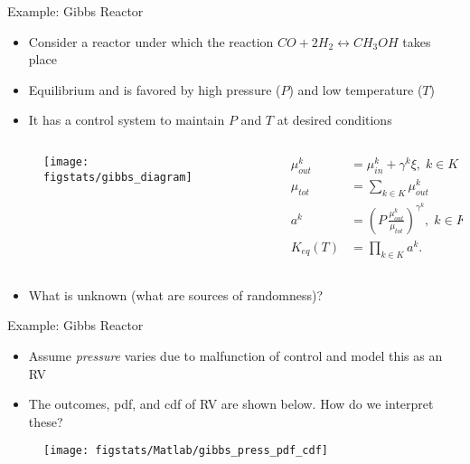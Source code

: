 \documentclass[9pt]{beamer}
\begin{document}
\begin{frame}{Example: Gibbs Reactor}

\begin{itemize}
\item Consider a reactor under which the reaction $CO+2H_2\leftrightarrow CH_3OH$ takes place
\item Equilibrium and is favored by high pressure ($P$) and low temperature ($T$)
\item It has a control system to maintain $P$ and $T$ at desired conditions
\end{itemize}

\begin{columns}
\begin{column}{0.3\textwidth}
\begin{figure}[!htb]
    \centering
	\texttt{[image: figstats/gibbs\_diagram]}
\end{figure}
\end{column}
\begin{column}{0.5\textwidth}
\begin{align*}
\mu_{out}^k&=\mu_{in}^k+\gamma^k\xi,\;k\in K\\
\mu_{tot}&=\sum_{k\in K}\mu_{out}^k\\
a^k&=\left(P\,\frac{\mu_{out}^k}{\mu_{tot}}\right)^{\gamma^k},\;k\in K\\
K_{eq}(T)&=\prod_{k\in K}a^k.
\end{align*}
\end{column}

\end{columns}


\begin{block}{}
\begin{itemize}
\item What is unknown (what are sources of randomness)?
\end{itemize}
\end{block}
\end{frame}

\begin{frame}{Example: Gibbs Reactor}

\begin{itemize}
\item Assume {\em pressure} varies due to malfunction of control and model this as an RV
\item The outcomes, pdf, and cdf of RV are shown below. How do we interpret these? 
\end{itemize}
\begin{figure}[!htb]
    \centering
	\texttt{[image: figstats/Matlab/gibbs\_press\_pdf\_cdf]}
\end{figure}

\end{frame}
\end{document}
